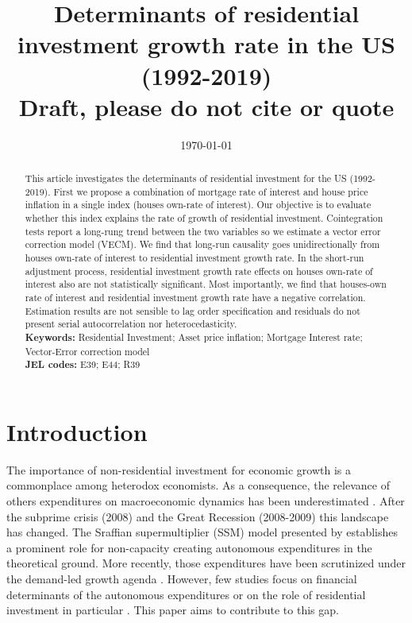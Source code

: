 \documentclass[12pt, a4paper]{article}
\author{}
\date{\today}
\title{Determinants of residential investment growth rate in the US (1992-2019)\\\medskip
\large Draft, please do not cite or quote}
\begin{document}
\maketitle



\begin{abstract}
This article investigates the determinants of residential investment for the US (1992-2019).
First we propose a combination of mortgage rate of interest and house price inflation in a single index (houses own-rate of interest).
Our objective is to evaluate whether this index explains the rate of growth of residential investment.
Cointegration tests report a long-rung trend between the two variables so we estimate a vector error correction model (VECM).
We find that long-run causality goes unidirectionally from houses own-rate of interest to residential investment growth rate.
In the short-run adjustment process, residential investment growth rate effects on houses own-rate of interest also are not statistically significant.
Most importantly, we find that houses-own rate of interest and residential investment growth rate have a negative correlation.
Estimation results are not sensible to lag order specification and residuals do not present serial autocorrelation nor heterocedasticity.
\\
\noindent \textbf{Keywords:} Residential Investment; Asset price inflation; Mortgage Interest rate; Vector-Error correction model\\
\noindent \textbf{JEL codes:} E39; E44; R39
\end{abstract}


\section{Introduction}
\label{sec:orgb3d66c2}
\label{sec:Introduction}
The importance of non-residential investment for economic growth is a commonplace among heterodox economists.
As a consequence, the relevance of others expenditures on macroeconomic dynamics has been underestimated \cite{brochier_macroeconomics_2017}.
After the subprime crisis (2008) and the Great Recession (2008-2009) this landscape has changed.
The Sraffian supermultiplier (SSM) model presented by \textcite{serrano_long_1995} establishes a prominent role for non-capacity creating autonomous expenditures in the theoretical ground.
More recently, those expenditures have been scrutinized under the demand-led growth agenda \cites{freitas_pattern_2013}{girardi_long-run_2016}{girardi_autonomous_2018}{braga_investment_2018}.
However, few studies focus on financial determinants of the autonomous expenditures or on the role of residential investment in particular \cites{petrini_2021_TD}{brochier_supermultiplier_2018}.
This paper aims to contribute to this gap.
\end{document}
